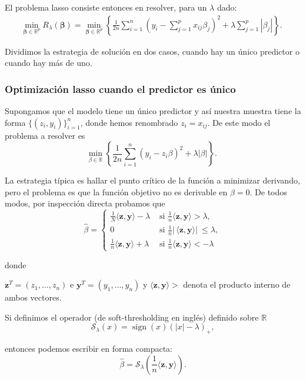 \documentclass{report}
\begin{document}
 El problema lasso consiste entonces en resolver, para un $\lambda$ dado: 
\begin{eqnarray}\label{lasso}
\min _{\boldsymbol{\beta} \in \mathbb{R}^{p}} R_{\lambda}(\boldsymbol{\beta})= \underset{\boldsymbol{\beta} \in \mathbb{R}^p}{\operatorname{min}}\left\{\frac{1}{2n} \sum_{i=1}^n\left(y_i-\sum_{j=1}^p x_{i j} \beta_j\right)^2+\lambda \sum_{j=1}^p\left|\beta_j\right|\right\} \text {. }
\end{eqnarray}

 
 Dividimos la estrategia de solución en dos casos, cuando hay un único predictor o cuando hay más de uno.  
 

\subsubsection*{Optimización lasso cuando el predictor es único}


 Supongamos que el modelo tiene un único predictor y así nuestra muestra tiene la forma $\{(z_i,y_i)\}_{i=1}^n$, donde hemos renombrado $z_i=x_{ij}$. De este modo el problema a resolver es 
$$
\min _{\beta \in \mathbb{R}} \left\{\frac{1}{2 n} \sum_{i=1}^n\left(y_i-z_i \beta\right)^2+\lambda|\beta|\right\} \text {. }
$$


 La estrategia típica es hallar el punto crítico de la función a minimizar derivando, pero el problema es que la función objetivo no es derivable en $\beta=0$. De todos modos, por inspección directa probamos que
$$
\widehat{\beta}= \begin{cases}\frac{1}{N}\langle\mathbf{z}, \mathbf{y}\rangle-\lambda & \text { si  } \frac{1}{n}\langle\mathbf{z}, \mathbf{y}\rangle>\lambda, \\ 0 & \text { si } \frac{1}{n}  \rvert\,\langle\mathbf{z}, \mathbf{y}\rangle \rvert\ \leq \lambda, \\ \frac{1}{n}\langle\mathbf{z}, \mathbf{y}\rangle+\lambda & \text { si  } \frac{1}{n}\langle\mathbf{z}, \mathbf{y}\rangle<-\lambda \end{cases}
$$

donde 

$\mathbf{z}^T=(z_1,\ldots,z_n)$ e  $\mathbf{y}^T=(y_1,\ldots,y_n)$ y $\langle\mathbf{z}, \mathbf{y}\rangle>$ denota el producto interno de ambos vectores. 


Si definimos el operador (de soft-thresholding en inglés) definido sobre $\mathbb{R}$
$$
\mathcal{S}_\lambda(x)=\operatorname{sign}(x)(|x|-\lambda)_{+},
$$


entonces podemos escribir en forma compacta:
$$ \widehat{\beta}= \mathcal{S}_\lambda(\frac{1}{n}\langle\mathbf{z}, \mathbf{y}\rangle).$$
\end{document}
